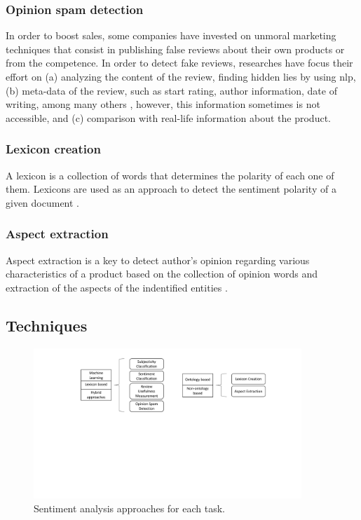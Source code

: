 \subsubsection{Opinion spam detection}
\label{subsubsection:opinion_spam_detection}

In order to boost sales, some companies have invested on unmoral marketing techniques that consist in publishing false reviews about their own products or from the competence. In order to detect fake reviews, researches have focus their effort on (a) analyzing the content of the review, finding hidden lies by using \acrshort{nlp}, (b) meta-data of the review, such as start rating, author information, date of writing, among many others \cite{hu2011fraud}, however, this information sometimes is not accessible, and (c) comparison with real-life information about the product. 

\subsubsection{Lexicon creation}
\label{subsubsection:lexicon_creation}

A lexicon is a collection of words that determines the polarity of each one of them. Lexicons are used as an approach to detect the sentiment polarity of a given document \cite{kaji2007building}.

\subsubsection{Aspect extraction}
\label{subsubsection:aspect_extraction}

Aspect extraction is a key to detect author's opinion regarding various characteristics of a product based on the collection of opinion words and extraction of the aspects of the indentified entities \cite{mukherjee2012aspect}.

\subsection{Techniques}
\label{subsec:sentiment_analysis_techniques}

\begin{figure}[!htp]
  \center
  \includegraphics[width=0.9\textwidth]{figures/sentiment_analysis_approaches}
  \caption{Sentiment analysis approaches for each task.}
  \label{fig:sentiment_analysis_approaches}
\end{figure}

